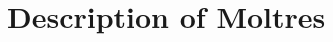 \documentclass[edeposit,fullpage,11pt]{uiucthesis2018}
\begin{document}
\chapter{Description of Moltres}
\label{chap:moltres}

\glsresetall

%
%
%
%
%
%
%

\backmatter



\end{document}
